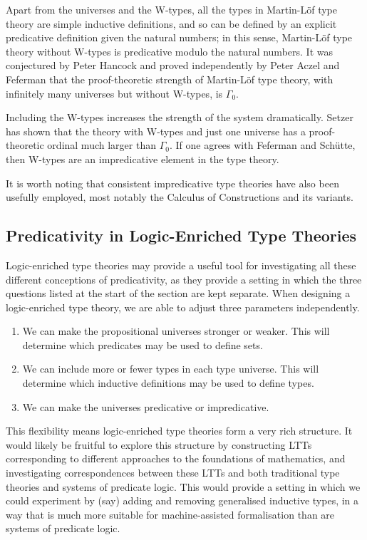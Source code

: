 \documentclass[acmtocl]{acmtrans2m}
\begin{document}
Apart from the universes and the W-types, all the types in
Martin-L\"of type theory are simple inductive definitions, and so
can be defined by an explicit predicative definition given the
natural numbers; in this sense, Martin-L\"of type theory without
W-types is predicative modulo the natural numbers.  It was
conjectured by Peter Hancock \cite{ml:ittpp} and proved independently by Peter
Aczel and Feferman \cite{feferman:iifpt} that the proof-theoretic
strength of Martin-L\"of type theory, with infinitely many universes
but without W-types, is $\Gamma_0$.

Including the W-types  increases the strength of the system dramatically.  Setzer  has shown that the theory with W-types and just one universe has a proof-theoretic ordinal much larger than $\Gamma_0$.  If one agrees with Feferman and Sch\"utte, then W-types are an impredicative element in the type theory.

It is worth noting that consistent impredicative type theories have also been usefully employed, most notably the Calculus of Constructions \cite{ch:coc} and its variants.

\subsection{Predicativity in Logic-Enriched Type Theories}

Logic-enriched type theories may provide a useful tool for investigating all these different conceptions of predicativity, as they provide a setting in which the three questions listed at the start of the section are kept separate.  When designing a logic-enriched type theory, we are able to adjust three parameters independently.
\begin{enumerate}
 \item We can make the propositional universes stronger or weaker.  This will determine which predicates may be used to define sets.
\item We can include more or fewer types in each type universe.  This will determine which inductive definitions may be used to define types.
\item We can make the universes predicative or impredicative.
\end{enumerate}
This flexibility means logic-enriched type theories form a very rich structure.  It would likely be fruitful to explore this structure by constructing LTTs corresponding to different approaches to the foundations of mathematics, and investigating correspondences between these LTTs and both traditional type theories and systems of predicate logic.  This would provide a setting in which we could experiment by (say) adding and removing generalised inductive types, in a way that is much more suitable for machine-assisted formalisation than are systems of predicate logic.
\end{document}
